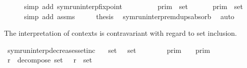 \begin{isabellebody}
\ \ \ \ \isamarkupfalse%
\ {\isacharparenleft}simp\ add{\isacharcolon}\ symrun{\isacharunderscore}interp{\isacharunderscore}fixpoint{\isacharparenright}\isanewline
\ \ \isamarkupfalse%
\ \isamarkupfalse%
\ {\isacartoucheopen}{\isasymInter}\ {\isacharparenleft}{\isacharparenleft}{\isasymlambda}{\isasymgamma}{\isachardot}\ {\isasymlbrakk}\ {\isasymgamma}\ {\isasymrbrakk}\isactrlsub p\isactrlsub r\isactrlsub i\isactrlsub m{\isacharparenright}\ {\isacharbackquote}\ set\ {\isasymGamma}{\isacharparenright}\ {\isacharequal}\ {\isasymInter}\ {\isacharparenleft}{\isacharparenleft}{\isasymlambda}{\isasymgamma}{\isachardot}\ {\isasymlbrakk}\ {\isasymgamma}\ {\isasymrbrakk}\isactrlsub p\isactrlsub r\isactrlsub i\isactrlsub m{\isacharparenright}\ {\isacharbackquote}\ set\ {\isasymGamma}{\isacharprime}{\isacharparenright}{\isacartoucheclose}\isanewline
\ \ \ \ \isamarkupfalse%
\ {\isacharparenleft}simp\ add{\isacharcolon}\ assms{\isacharparenright}\isanewline
\ \ \isamarkupfalse%
\ \isamarkupfalse%
\ {\isacharquery}thesis\ \isamarkupfalse%
\ symrun{\isacharunderscore}interp{\isacharunderscore}remdups{\isacharunderscore}absorb\ \isamarkupfalse%
\ auto\isanewline
{}\isamarkupfalse%
%
\endisatagproof
{\isafoldproof}%
%
\isadelimproof
%
\endisadelimproof
%
\begin{isamarkuptext}%
The interpretation of contexts is contravariant with regard to set inclusion.%
\end{isamarkuptext}\isamarkuptrue%
\isamarkupfalse%
\ symrun{\isacharunderscore}interp{\isacharunderscore}decreases{\isacharunderscore}setinc{\isacharcolon}\isanewline
\ \ \ {\isacartoucheopen}set\ {\isasymGamma}\ {\isasymsubseteq}\ set\ {\isasymGamma}{\isacharprime}{\isacartoucheclose}\isanewline
\ \ \ \ \ {\isacartoucheopen}{\isasymlbrakk}{\isasymlbrakk}\ {\isasymGamma}\ {\isasymrbrakk}{\isasymrbrakk}\isactrlsub p\isactrlsub r\isactrlsub i\isactrlsub m\ {\isasymsupseteq}\ {\isasymlbrakk}{\isasymlbrakk}\ {\isasymGamma}{\isacharprime}\ {\isasymrbrakk}{\isasymrbrakk}\isactrlsub p\isactrlsub r\isactrlsub i\isactrlsub m{\isacartoucheclose}\isanewline
%
\isadelimproof
%
\endisadelimproof
%
\isatagproof
{}\isamarkupfalse%
\ {\isacharminus}\isanewline
\ \ \isamarkupfalse%
\ {\isasymGamma}\isactrlsub r\ \ decompose{\isacharcolon}\ {\isacartoucheopen}set\ {\isacharparenleft}{\isasymGamma}\ {\isacharat}\ {\isasymGamma}\isactrlsub r{\isacharparenright}\ {\isacharequal}\ set\ {\isasymGamma}{\isacharprime}{\isacartoucheclose}\ \isamarkupfalse%

\end{isabellebody}
